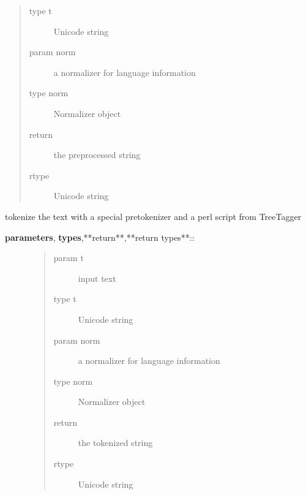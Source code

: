 \documentclass[letterpaper,10pt,english]{sphinxmanual}
\begin{document}
\begin{fulllineitems}
\begin{fulllineitems}
\begin{description}
\begin{quote}
\begin{description}
\item[{type t}] \leavevmode
Unicode string

\item[{param norm}] \leavevmode
a normalizer for language information

\item[{type norm}] \leavevmode
Normalizer object

\item[{return}] \leavevmode
the preprocessed string

\item[{rtype}] \leavevmode
Unicode string

\end{description}\end{quote}

\end{description}

\end{fulllineitems}


\begin{fulllineitems}
\label{API:norm.prepro.rewrite.Rewrite.tokenize}
tokenize the text with a special pretokenizer and a perl script from TreeTagger
\begin{description}
\item[{\textbf{parameters}, \textbf{types},**return**,**return types**::}] \leavevmode\begin{quote}\begin{description}
\item[{param t}] \leavevmode
input text

\item[{type t}] \leavevmode
Unicode string

\item[{param norm}] \leavevmode
a normalizer for language information

\item[{type norm}] \leavevmode
Normalizer object

\item[{return}] \leavevmode
the tokenized string

\item[{rtype}] \leavevmode
Unicode string

\end{description}\end{quote}


\end{description}
\end{fulllineitems}
\end{fulllineitems}
\end{document}
